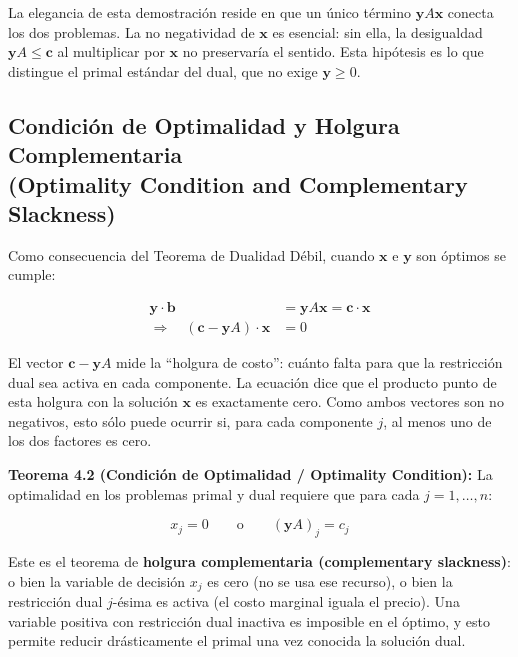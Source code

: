 \documentclass[12pt]{article}
\begin{document}
\begin{intuicion}
La elegancia de esta demostraci\'on reside en que un \'unico t\'ermino
$\mathbf{y}A\mathbf{x}$ conecta los dos problemas. La no negatividad de
$\mathbf{x}$ es esencial: sin ella, la desigualdad $\mathbf{y}A \leq \mathbf{c}$
al multiplicar por $\mathbf{x}$ no preservar\'ia el sentido. Esta hip\'otesis
es lo que distingue el primal est\'andar del dual, que no exige $\mathbf{y} \geq 0$.
\end{intuicion}

\subsection{Condici\'on de Optimalidad y Holgura Complementaria\\
            (Optimality Condition and Complementary Slackness)}

Como consecuencia del Teorema de Dualidad D\'ebil, cuando $\mathbf{x}$ e
$\mathbf{y}$ son \'optimos se cumple:

\begin{align}
  \mathbf{y} \cdot \mathbf{b} &= \mathbf{y}A\mathbf{x} = \mathbf{c} \cdot \mathbf{x} \nonumber \\
  \Rightarrow\quad (\mathbf{c} - \mathbf{y}A) \cdot \mathbf{x} &= 0
  \label{eq:holgura}
\end{align}

\begin{intuicionmat}
El vector $\mathbf{c} - \mathbf{y}A$ mide la ``holgura de costo'': cu\'anto
falta para que la restricci\'on dual sea activa en cada componente. La
ecuaci\'on dice que el producto punto de esta holgura con la soluci\'on
$\mathbf{x}$ es exactamente cero. Como ambos vectores son no negativos,
esto s\'olo puede ocurrir si, para cada componente $j$, al menos uno de
los dos factores es cero.
\end{intuicionmat}

\textbf{Teorema 4.2 (Condici\'on de Optimalidad / Optimality Condition):}
La optimalidad en los problemas primal y dual requiere que para cada
$j = 1, \ldots, n$:

\begin{equation}
  x_j = 0 \qquad \text{o} \qquad (\mathbf{y}A)_j = c_j
\end{equation}

\begin{intuicionmat}
Este es el teorema de \textbf{holgura complementaria (complementary slackness)}:
o bien la variable de decisi\'on $x_j$ es cero (no se usa ese recurso), o
bien la restricci\'on dual $j$-\'esima es activa (el costo marginal iguala el
precio). Una variable positiva con restricci\'on dual inactiva es imposible
en el \'optimo, y esto permite reducir dr\'asticamente el primal una vez
conocida la soluci\'on dual.
\end{intuicionmat}
\end{document}
